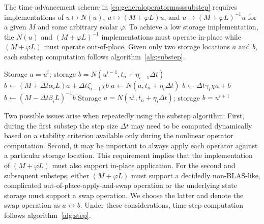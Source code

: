 \documentclass[letterpaper,11pt,nointlimits,reqno,draft]{amsart}
\begin{document}
The time advancement scheme in \eqref{eq:generaloperatormasssubstep} requires
implementations of $u\mapsto{}{N}\left(u\right)$,
$u\mapsto{}\left(M+\varphi{}L\right)u$, and
$u\mapsto{}\left(M+\varphi{}L\right)^{-1}u$ for a given $M$ and some arbitrary
scalar $\varphi$.  To achieve a low storage implementation, the
$N\left(u\right)$ and $\left(M+\varphi{}L\right)^{-1}$ implementations must
operate in-place while $\left(M+\varphi{}L\right)$ must operate out-of-place.
Given only two storage locations $a$ and $b$, each substep computation follows
algorithm~\vref{alg:substep}.

\begin{algorithm}
\label{alg:substep}
\caption{Compute one substep in the SMR91 scheme following
         equation (\ref{eq:generaloperatormasssubstep}) %
         }
\begin{algorithmic}
  \REQUIRE Storage $a = u^i$;
           storage $b = N\left(u^{i-1},t_{n}+\eta_{i-1}\Delta{}t\right)$
  \STATE $b\leftarrow{}   \left(M+\Delta{}t\alpha_{i}L\right)a
                        + \Delta{}t\zeta_{i-1}\chi{}b$
  \STATE $a\leftarrow{}N\left(a,t_{n}+\eta_{i}\Delta{}t\right)$
  \STATE $b\leftarrow{}\Delta{}t\gamma_{i}\chi{}a + b$
  \STATE $b\leftarrow{}\left(M-\Delta{}t\beta_{i}L\right)^{-1}b$
  \ENSURE Storage $a = N\left(u^{i},t_{n}+\eta_{i}\Delta{}t\right)$;
          storage $b = u^{i+1}$
\end{algorithmic}
\end{algorithm}

Two possible issues arise when repeatedly using the substep algorithm: First,
during the first substep the step size $\Delta{}t$ may need to be computed
dynamically based on a stability criterion available only during the nonlinear
operator computation.  Second, it may be important to always apply each
operator against a particular storage location.  This requirement implies that
the implementation of $\left(M+\varphi{}L\right)$ must also support in-place
application.  For the second and subsequent substeps, either
$\left(M+\varphi{}L\right)$ must support a decidedly non-BLAS-like, complicated
out-of-place-apply-and-swap operation or the underlying state storage must
support a swap operation.  We choose the latter and denote the swap operation
as $a\leftrightarrow{}b$.  Under these considerations, time step computation
follows algorithm~\vref{alg:step}.
\end{document}
